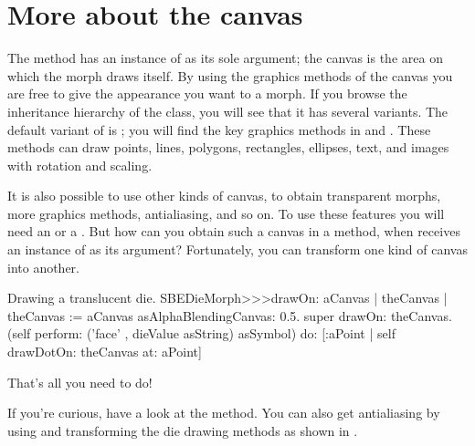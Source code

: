 \documentclass[a4paper,10pt,twoside]{book}
\begin{document}


\section{More about the canvas}

The  method has an instance of  as its sole argument; the canvas is the area on which the morph draws itself.
By using the graphics methods of the canvas you are free to give the appearance you want to a morph.
If you browse the inheritance hierarchy of the  class, you will see that it has several variants.
The default variant of  is ; you will find the key graphics methods in  and .
These methods can draw points, lines, polygons, rectangles, ellipses, text, and images with rotation and scaling.

It is also possible to use other kinds of canvas, to obtain transparent morphs, more graphics methods, antialiasing, and so on.
To use these features you will need an  or a .
But how can you obtain such a canvas in a  method, when  receives an instance of  as its argument?
Fortunately, you can transform one kind of canvas into another.

\begin{method}{Drawing a translucent die.}
SBEDieMorph>>>drawOn: aCanvas
	| theCanvas |
	theCanvas := aCanvas asAlphaBlendingCanvas: 0.5.
	super drawOn: theCanvas.
	(self perform: ('face' , dieValue asString) asSymbol)
		do: [:aPoint | self drawDotOn: theCanvas at: aPoint]
\end{method}
\noindent
That's all you need to do!

If you're curious, have a look at the  method.
You can also get antialiasing by using  and transforming the die drawing methods as shown in .
\end{document}
